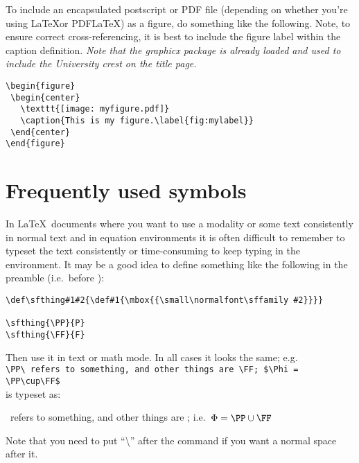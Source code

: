 To include an encapsulated postscript or PDF file (depending on whether you're using \LaTeX or PDF\LaTeX) as a figure, do
something like the following.  Note, to ensure correct
cross-referencing, it is best to include the figure label within
the caption definition.  \emph{Note that the graphicx package 
is already loaded and used to include the
University crest on the title page.}

\begin{verbatim}
\begin{figure}
 \begin{center}
   \texttt{[image: myfigure.pdf]}    
   \caption{This is my figure.\label{fig:mylabel}}
 \end{center}
\end{figure}
\end{verbatim}

\section{Frequently used symbols\label{sec:fus}}

In \LaTeX\ documents where you want to use a modality or some text consistently in normal text and in equation environments it is often difficult to remember to typeset the text consistently or time-consuming to keep typing in the environment. It may be a good idea to define something like the following in the preamble (i.e.\ before \verb++):

\begin{verbatim}
\def\sfthing#1#2{\def#1{\mbox{{\small\normalfont\sffamily #2}}}}

\sfthing{\PP}{P}
\sfthing{\FF}{F}
\end{verbatim}

Then use it in text or math mode. In all cases it looks the same; e.g.\\
\verb+\PP\ refers to something, and other things are \FF; $\Phi = \PP\cup\FF$+\\
is typeset as:

\PP\ refers to something, and other things are \FF; i.e.\ $\Phi = \PP\cup\FF$

Note that you need to put ``\textbackslash'' after the command if you want a normal space after it.
